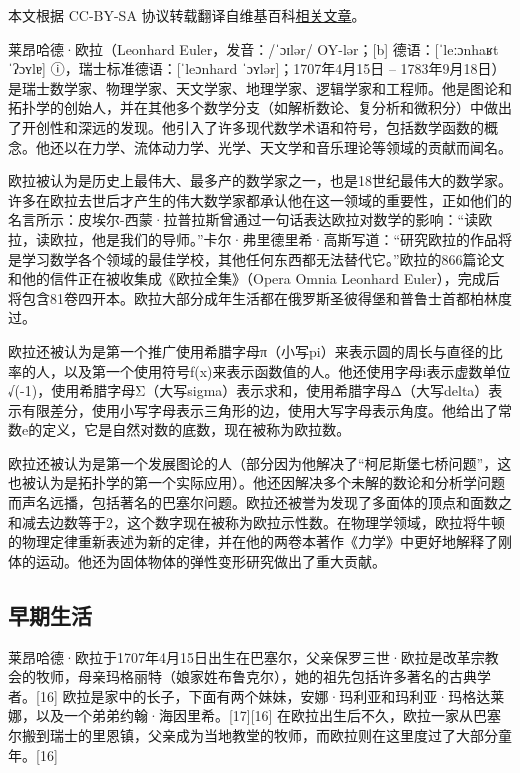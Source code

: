
本文根据 CC-BY-SA 协议转载翻译自维基百科\href{https://en.wikipedia.org/wiki/Leonhard_Euler}{相关文章}。

莱昂哈德·欧拉（Leonhard Euler，发音：/ˈɔɪlər/ OY-lər；[b] 德语：[ˈleːɔnhaʁt ˈʔɔʏlɐ] ⓘ，瑞士标准德语：[ˈleɔnhard ˈɔʏlər]；1707年4月15日 – 1783年9月18日）是瑞士数学家、物理学家、天文学家、地理学家、逻辑学家和工程师。他是图论和拓扑学的创始人，并在其他多个数学分支（如解析数论、复分析和微积分）中做出了开创性和深远的发现。他引入了许多现代数学术语和符号，包括数学函数的概念。他还以在力学、流体动力学、光学、天文学和音乐理论等领域的贡献而闻名。

欧拉被认为是历史上最伟大、最多产的数学家之一，也是18世纪最伟大的数学家。许多在欧拉去世后才产生的伟大数学家都承认他在这一领域的重要性，正如他们的名言所示：皮埃尔-西蒙·拉普拉斯曾通过一句话表达欧拉对数学的影响：“读欧拉，读欧拉，他是我们的导师。”卡尔·弗里德里希·高斯写道：“研究欧拉的作品将是学习数学各个领域的最佳学校，其他任何东西都无法替代它。”欧拉的866篇论文和他的信件正在被收集成《欧拉全集》（Opera Omnia Leonhard Euler），完成后将包含81卷四开本。欧拉大部分成年生活都在俄罗斯圣彼得堡和普鲁士首都柏林度过。

欧拉还被认为是第一个推广使用希腊字母π（小写pi）来表示圆的周长与直径的比率的人，以及第一个使用符号f(x)来表示函数值的人。他还使用字母i表示虚数单位√(-1)，使用希腊字母Σ（大写sigma）表示求和，使用希腊字母Δ（大写delta）表示有限差分，使用小写字母表示三角形的边，使用大写字母表示角度。他给出了常数e的定义，它是自然对数的底数，现在被称为欧拉数。

欧拉还被认为是第一个发展图论的人（部分因为他解决了“柯尼斯堡七桥问题”，这也被认为是拓扑学的第一个实际应用）。他还因解决多个未解的数论和分析学问题而声名远播，包括著名的巴塞尔问题。欧拉还被誉为发现了多面体的顶点和面数之和减去边数等于2，这个数字现在被称为欧拉示性数。在物理学领域，欧拉将牛顿的物理定律重新表述为新的定律，并在他的两卷本著作《力学》中更好地解释了刚体的运动。他还为固体物体的弹性变形研究做出了重大贡献。
\subsection{早期生活}
莱昂哈德·欧拉于1707年4月15日出生在巴塞尔，父亲保罗三世·欧拉是改革宗教会的牧师，母亲玛格丽特（娘家姓布鲁克尔），她的祖先包括许多著名的古典学者。[16] 欧拉是家中的长子，下面有两个妹妹，安娜·玛利亚和玛利亚·玛格达莱娜，以及一个弟弟约翰·海因里希。[17][16] 在欧拉出生后不久，欧拉一家从巴塞尔搬到瑞士的里恩镇，父亲成为当地教堂的牧师，而欧拉则在这里度过了大部分童年。[16]

